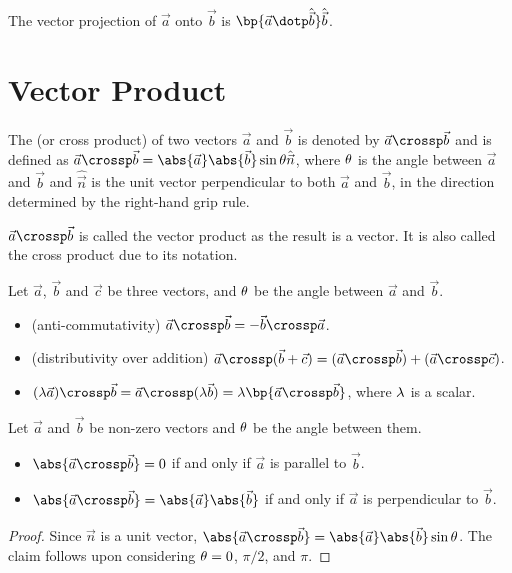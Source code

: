 \begin{corollary}
    The vector projection of $\vec a$ onto $\vec b$ is $\bp{\vec a \dotp \hat{\vec b}} \hat{\vec b}$.
\end{corollary}

\section{Vector Product}

\begin{definition}
    The  (or cross product) of two vectors $\vec a$ and $\vec b$ is denoted by $\vec a \crossp \vec b$ and is defined as $\vec a \crossp \vec b = \abs{\vec a}\abs{\vec b} \sin{\t} \hat{\vec n}$, where $\theta$ is the angle between $\vec a$ and $\vec b$ and $\hat{\vec n}$ is the unit vector perpendicular to both $\vec a$ and $\vec b$, in the direction determined by the right-hand grip rule.
\end{definition}
\begin{remark}
    $\vec a \crossp \vec b$ is called the vector product as the result is a vector. It is also called the cross product due to its notation.
\end{remark}

\begin{fact}
    Let $\vec a$, $\vec b$ and $\vec c$ be three vectors, and $\theta$ be the angle between $\vec a$ and $\vec b$.
    \begin{itemize}
        \item (anti-commutativity) $\vec a \crossp \vec b = -\vec b \crossp \vec a$.
        \item (distributivity over addition) $\vec a \crossp (\vec b + \vec c) = (\vec a \crossp \vec b) + (\vec a \crossp \vec c)$.
        \item $(\l \vec a) \crossp \vec b = \vec a \crossp (\l \vec b) = \l \bp{\vec a \crossp \vec b}$, where $\lambda$ is a scalar.
    \end{itemize}
\end{fact}

\begin{proposition}
    Let $\vec a$ and $\vec b$ be non-zero vectors and $\theta$ be the angle between them.
    \begin{itemize}
        \item $\abs{\vec a \crossp \vec b} = 0$ if and only if $\vec a$ is parallel to $\vec b$.
        \item $\abs{\vec a \crossp \vec b} = \abs{\vec a} \abs{\vec b}$ if and only if $\vec a$ is perpendicular to $\vec b$.
    \end{itemize}
\end{proposition}
\begin{proof}
    Since $\hat{\vec n}$ is a unit vector, $\abs{\vec a \crossp \vec b} = \abs{\vec a} \abs{\vec b} \sin \t$. The claim follows upon considering $\theta = 0$, $\pi/2$, and $\pi$.
\end{proof}

